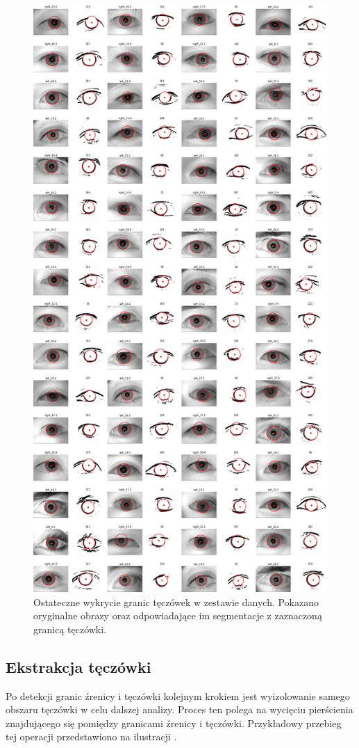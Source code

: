 \documentclass[a4paper]{article}
\begin{document}
\begin{figure}[H]
    \centering
    \includegraphics[width=0.7\linewidth]{figures/irises_detected_many.png}
    \caption{Ostateczne wykrycie granic tęczówek w zestawie danych. Pokazano oryginalne obrazy oraz odpowiadające im segmentacje z zaznaczoną granicą tęczówki.}
    \label{fig:irises_detected_many}
\end{figure}

\subsection{Ekstrakcja tęczówki}
Po detekcji granic źrenicy i tęczówki kolejnym krokiem jest wyizolowanie samego obszaru tęczówki w celu dalszej analizy. Proces ten polega na wycięciu pierścienia znajdującego się pomiędzy granicami źrenicy i tęczówki. Przykładowy przebieg tej operacji przedstawiono na ilustracji .
\end{document}

